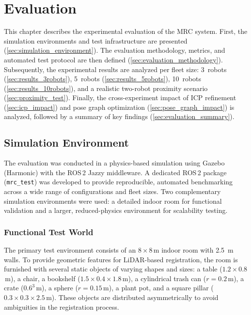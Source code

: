 \chapter{Evaluation}
\label{ch:evaluation}

This chapter describes the experimental evaluation of the MRC system.
First, the simulation environments and test infrastructure are presented
(\autoref{sec:simulation_environment}).
The evaluation methodology, metrics, and automated test protocol are
then defined (\autoref{sec:evaluation_methodology}).
Subsequently, the experimental results are analyzed per fleet size:
3~robots (\autoref{sec:results_3robots}), 5~robots
(\autoref{sec:results_5robots}), 10~robots
(\autoref{sec:results_10robots}), and a realistic two-robot proximity
scenario (\autoref{sec:proximity_test}).
Finally, the cross-experiment impact of ICP refinement
(\autoref{sec:icp_impact}) and pose graph optimization
(\autoref{sec:pose_graph_impact}) is analyzed, followed by a summary
of key findings (\autoref{sec:evaluation_summary}).

\section{Simulation Environment}
\label{sec:simulation_environment}

The evaluation was conducted in a physics-based simulation using Gazebo
(Harmonic) with the ROS\,2 Jazzy middleware.
A dedicated ROS\,2 package (\texttt{mrc\_test}) was developed to
provide reproducible, automated benchmarking across a wide range of
configurations and fleet sizes.
Two complementary simulation environments were used: a detailed
indoor room for functional validation and a larger, reduced-physics
environment for scalability testing.

\subsection{Functional Test World}
\label{sec:test_world}

The primary test environment consists of an $8 \times 8$\,m indoor
room with \SI{2.5}{\metre} walls.
To provide geometric features for LiDAR-based registration, the
room is furnished with several static objects of varying shapes
and sizes: a table ($1.2 \times 0.8$\,m), a chair, a bookshelf
($1.5 \times 0.4 \times 1.8$\,m), a cylindrical trash can
($r = 0.2$\,m), a crate ($0.6^3$\,m), a sphere ($r = 0.15$\,m),
a plant pot, and a square pillar ($0.3 \times 0.3 \times 2.5$\,m).
These objects are distributed asymmetrically to avoid ambiguities
in the registration process.

